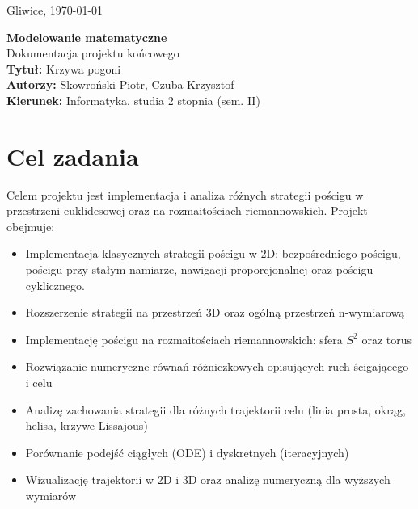 \documentclass[12pt,a4paper]{article}
\begin{document}
\begin{flushright}
Gliwice, \today
\end{flushright}

\vspace{1cm}

\begin{center}
{\Large \textbf{Modelowanie matematyczne}}\\[0.5cm]
{\Large Dokumentacja projektu końcowego}\\[1cm]

{\large \textbf{Tytuł:} Krzywa pogoni}\\[0.5cm]

{\large \textbf{Autorzy:} Skowroński Piotr, Czuba Krzysztof}\\[0.3cm]

{\large \textbf{Kierunek:} Informatyka, studia 2 stopnia (sem. II)}
\end{center}

\vspace{1cm}

\tableofcontents
\newpage

\section{Cel zadania}

Celem projektu jest implementacja i analiza różnych strategii pościgu  w przestrzeni euklidesowej oraz na rozmaitościach riemannowskich. Projekt obejmuje:

\begin{itemize}
    \item Implementacja klasycznych strategii pościgu w 2D: bezpośredniego pościgu, pościgu przy stałym namiarze, nawigacji proporcjonalnej oraz pościgu cyklicznego.
    \item Rozszerzenie strategii na przestrzeń 3D oraz ogólną przestrzeń n-wymiarową
    \item Implementację pościgu na rozmaitościach riemannowskich: sfera $S^2$ oraz torus
    \item Rozwiązanie numeryczne równań różniczkowych opisujących ruch ścigającego i celu
    \item Analizę zachowania strategii dla różnych trajektorii celu (linia prosta, okrąg, helisa, krzywe Lissajous)
    \item Porównanie podejść ciągłych (ODE) i dyskretnych (iteracyjnych)
    \item Wizualizację trajektorii w 2D i 3D oraz analizę numeryczną dla wyższych wymiarów
\end{itemize}
\end{document}
